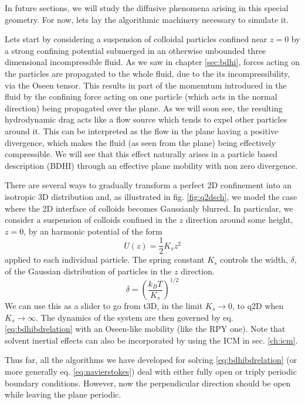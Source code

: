 \documentclass[ twoside,openright,titlepage,numbers=noenddot,%
headinclude,footinclude,cleardoublepage=empty,abstract=on,
BCOR=5mm,paper=a4,fontsize=11pt, dvipsnames
]{scrreprt}
\newcommand{\kT}{k_B T}
\newcommand{\half}{\frac{1}{2}}
\begin{document}
In future sections, we will study the diffusive phenomena arising in this special geometry. For now, lets lay the algorithmic machinery necessary to simulate it.

Lets start by considering a suspension of colloidal particles confined near $z=0$ by a strong confining potential submerged in an otherwise unbounded three dimensional incompressible fluid. As we saw in chapter \ref{sec:bdhi}, forces acting on the particles are propagated to the whole fluid, due to the its incompressibility, via the Oseen tensor. This results in part of the momemtum introduced in the fluid by the confining force acting on one particle (which acts in the normal direction) being propagated over the plane. As we will soon see, the resulting hydrodynamic drag acts like a flow source which tends to expel other particles around it. This can be interpreted as the flow in the plane having a positive divergence, which makes the fluid (as seen from the plane) being effectively compressible. We will see that this effect naturally arises in a particle based description (\gls{BDHI}) through an effective plane mobility with non zero divergence\cite{Pelaez2017}.

There are several ways to gradually transform a perfect 2D confinement into an isotropic 3D distribution and, as illustrated in fig. \ref{fig:q2dsch}, we model the case where the 2D interface of colloids becomes Gaussianly blurred. In particular, we consider a suspension of colloids confined in the $z$ direction around some height, $z=0$, by an harmonic potential of the form
\begin{equation}
U(z)=\half K_sz^2
\end{equation}
applied to each individual particle.
The spring constant $K_s$ controls the width, $\delta$, of the Gaussian distribution of particles in the $z$ direction.
\begin{equation}
  \delta = \left(\frac{\kT}{K_s}\right)^{1/2}
\end{equation}
We can use this as a slider to go from t3D, in the limit $K_s\rightarrow 0$, to q2D when $K_s\rightarrow\infty$.
The dynamics of the system are then governed by eq. \eqref{eq:bdhibdrelation} with an Oseen-like mobility (like the \gls{RPY} one). Note that solvent inertial effects can also be incorporated by using the \gls{ICM} in sec. \ref{ch:icm}.

Thus far, all the algorithms we have developed for solving \eqref{eq:bdhibdrelation} (or more generally eq. \eqref{eq:navierstokes}) deal with either fully open or triply periodic boundary conditions. However, now the perpendicular direction should be open while leaving the plane periodic.
\end{document}
